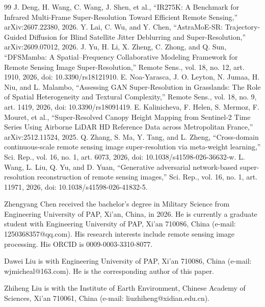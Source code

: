 \documentclass[journal,twoside,10pt]{IEEEtran}
\begin{document}
\begin{thebibliography}{99}
J. Deng, H. Wang, C. Wang, J. Shen, et al., ``IR275K: A Benchmark for Infrared Multi-Frame Super-Resolution Toward Efficient Remote Sensing,'' arXiv:2607.22380, 2026.
Y. Lai, C. Wu, and Y. Chen, ``AstraMoE-SR: Trajectory-Guided Diffusion for Blind Satellite Jitter Deblurring and Super-Resolution,'' arXiv:2609.07012, 2026.
J. Yu, H. Li, X. Zheng, C. Zhong, and Q. Sun, ``DFSMamba: A Spatial--Frequency Collaborative Modeling Framework for Remote Sensing Image Super-Resolution,'' Remote Sens., vol. 18, no. 12, art. 1910, 2026, doi: 10.3390/rs18121910.
E. Noa-Yarasca, J. O. Leyton, N. Jumaa, H. Niu, and L. Malambo, ``Assessing GAN Super-Resolution in Grasslands: The Role of Spatial Heterogeneity and Textural Complexity,'' Remote Sens., vol. 18, no. 9, art. 1419, 2026, doi: 10.3390/rs18091419.
E. Kalinicheva, F. Helen, S. Mermoz, F. Mouret, et al., ``Super-Resolved Canopy Height Mapping from Sentinel-2 Time Series Using Airborne LiDAR HD Reference Data across Metropolitan France,'' arXiv:2512.11524, 2025.
Q. Zhang, S. Ma, Y. Tang, and L. Zheng, ``Cross-domain continuous-scale remote sensing image super-resolution via meta-weight learning,'' Sci. Rep., vol. 16, no. 1, art. 6073, 2026, doi: 10.1038/s41598-026-36632-w.
L. Wang, L. Liu, Q. Yu, and D. Yuan, ``Generative adversarial network-based super-resolution reconstruction of remote sensing images,'' Sci. Rep., vol. 16, no. 1, art. 11971, 2026, doi: 10.1038/s41598-026-41832-5.
\end{thebibliography}


\begin{IEEEbiographynophoto}{Zhengyang Chen}
received the bachelor's degree in Military Science from Engineering University of PAP, Xi'an, China, in 2026. He is currently a graduate student with Engineering University of PAP, Xi'an 710086, China (e-mail: 1250368357@qq.com). His research interests include remote sensing image processing. His ORCID is 0009-0003-3310-8077.
\end{IEEEbiographynophoto}

\begin{IEEEbiographynophoto}{Dawei Liu}
is with Engineering University of PAP, Xi'an 710086, China (e-mail: wjmicheal@163.com). He is the corresponding author of this paper.
\end{IEEEbiographynophoto}

\begin{IEEEbiographynophoto}{Zhiheng Liu}
is with the Institute of Earth Environment, Chinese Academy of Sciences, Xi'an 710061, China (e-mail: liuzhiheng@xidian.edu.cn).
\end{IEEEbiographynophoto}
\end{document}
